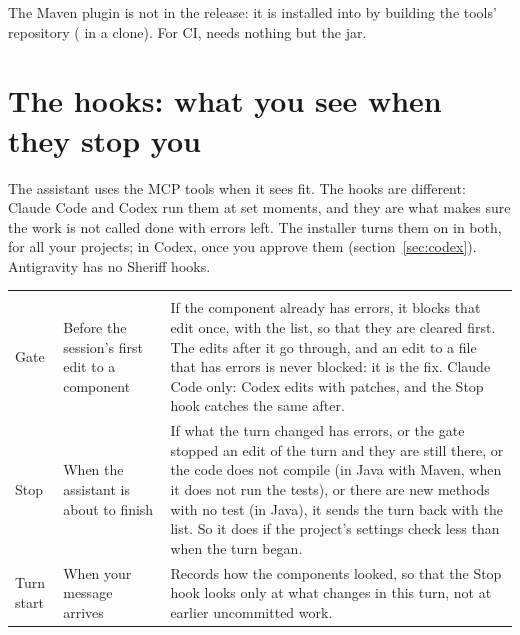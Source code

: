 \documentclass[11pt,a4paper]{article}
\begin{document}
\begin{note}
The Maven plugin is not in the release: it is installed into  by
building the tools' repository ( in a clone). For CI,
 needs nothing but the jar.
\end{note}

\section{The hooks: what you see when they stop you}
\label{sec:hooks}

The assistant uses the MCP tools when it sees fit. The hooks are different:
Claude Code and Codex run them at set moments, and they are what makes sure the
work is not called done with errors left. The installer turns them on in both,
for all your projects; in Codex, once you approve them (section~\ref{sec:codex}).
Antigravity has no Sheriff hooks.

\begin{center}
\begin{tabularx}{\linewidth}{@{\hspace{6pt}}K{24mm}>{\raggedright\arraybackslash}p{35mm}L}
\headrow {} &  &  \\
Gate & Before the session's first edit to a component &
  If the component already has errors, it blocks that edit once, with the
  list, so that they are cleared first. The edits after it go through, and an
  edit to a file that has errors is never blocked: it is the fix. Claude
  Code only: Codex edits with patches, and the Stop hook catches the same
  after. \\
Stop & When the assistant is about to finish &
  If what the turn changed has errors, or the gate stopped an edit of the turn
  and they are still there, or the code does not compile (in Java with Maven,
  when it does not run the tests), or there are new methods with no test (in Java),
  it sends the turn back with the list. So it does if the project's settings
  check less than when the turn began. \\
Turn start & When your message arrives &
  Records how the components looked, so that the Stop hook looks only at what
  changes in this turn, not at earlier uncommitted work. \\
\end{tabularx}
\end{center}
\end{document}

